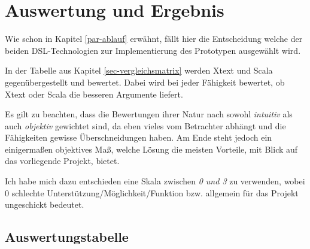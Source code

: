 \section{Auswertung und Ergebnis}\label{sec-auswertung}

Wie schon in Kapitel \ref{par-ablauf} erwähnt,
  fällt hier die Entscheidung welche der beiden
  DSL-Technologien zur Implementierung des Prototypen ausgewählt wird.

In der Tabelle aus Kapitel \ref{sec-vergleichsmatrix} werden Xtext und
Scala gegenübergestellt und bewertet.
Dabei wird bei jeder Fähigkeit bewertet,
  ob Xtext oder Scala die besseren Argumente liefert.

Es gilt zu beachten, dass die Bewertungen ihrer Natur nach sowohl
\emph{intuitiv} als auch \emph{objektiv} gewichtet sind, da eben vieles vom
Betrachter abhängt und die Fähigkeiten gewisse Überschneidungen haben.
Am Ende steht jedoch ein einigermaßen objektives Maß,
welche Lösung die meisten Vorteile, mit Blick
auf das vorliegende Projekt, bietet.

Ich habe mich dazu entschieden eine Skala zwischen \emph{0 und 3} zu verwenden,
wobei 0 schlechte Unterstützung/Möglichkeit/Funktion bzw.
allgemein für das Projekt ungeschickt bedeutet.


\subsection{Auswertungstabelle}\label{sec-auswertungstabelle}

